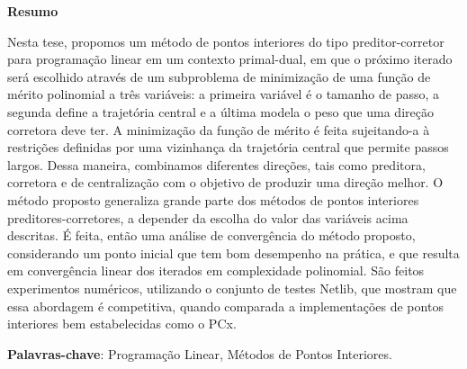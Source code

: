 \begin{center}
  \large{\textbf{Resumo}}
\end{center}

Nesta tese, propomos um método de pontos interiores do tipo preditor-corretor para programação linear em um contexto primal-dual, em que o próximo iterado será escolhido através de um subproblema de minimização de uma função de mérito polinomial a três variáveis: a primeira variável é o tamanho de passo, a segunda define a trajetória central e a última modela o peso que uma direção corretora deve ter.  A minimização da função de mérito é feita  sujeitando-a à restrições  definidas por uma vizinhança da trajetória central que permite passos largos. Dessa maneira, combinamos diferentes direções, tais como preditora, corretora e de centralização com o objetivo de produzir uma direção melhor. O método proposto generaliza grande parte dos métodos de pontos interiores preditores-corretores, a depender da escolha do valor das variáveis  acima descritas. É feita, então uma análise de convergência do método proposto, considerando um ponto inicial que tem bom desempenho na prática, e que resulta em convergência linear dos iterados em complexidade polinomial. São feitos experimentos numéricos, utilizando o conjunto de testes Netlib, que mostram que essa abordagem é competitiva, quando comparada a implementações de pontos interiores bem estabelecidas como o PCx.




\vspace{.2cm}
\textbf{Palavras-chave}:
Programação Linear, Métodos de Pontos Interiores.
